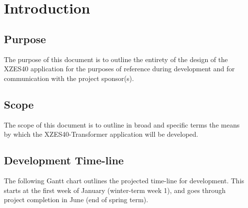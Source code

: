 \tableofcontents

\section{Introduction}

\subsection{Purpose}

The purpose of this document is to outline the entirety of the design of the XZES40 application for the purposes of reference during development and for communication with the project sponsor(s).

\subsection{Scope}

The scope of this document is to outline in broad and specific terms the means by which the XZES40-Transformer application will be developed.

\subsection{Development Time-line}

The following Gantt chart outlines the projected time-line for development.
This starts at the first week of January (winter-term week 1), and goes through project completion in June (end of spring term).

